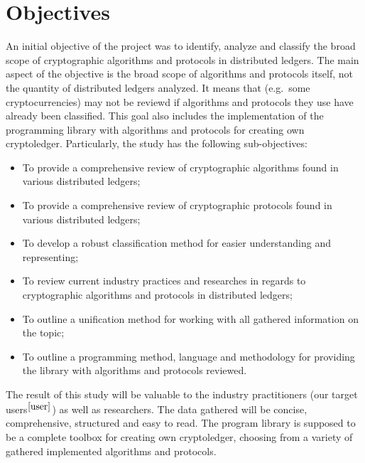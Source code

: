 \documentclass[12pt]{article}
\begin{document}
\section{Objectives}
An initial objective of the project was to identify, analyze and classify the
broad scope of cryptographic algorithms and protocols in distributed ledgers.
The main aspect of the objective is the broad scope of algorithms and protocols
itself, not the quantity of distributed ledgers analyzed. It means that (e.g.\
some cryptocurrencies) may not be reviewd if algorithms and protocols they use
have already been classified. This goal also includes the implementation of the
programming library with algorithms and protocols for creating own
cryptoledger.
Particularly, the study has the following sub-objectives:
\begin{itemize}
    \item To provide a comprehensive review of cryptographic algorithms found
          in various distributed ledgers;
    \item To provide a comprehensive review of cryptographic protocols found in
          various distributed ledgers;
    \item To develop a robust classification method for easier understanding
          and representing;
    \item To review current industry practices and researches in regards to
          cryptographic algorithms and protocols in distributed ledgers;
    \item To outline a unification method for working with all gathered
          information on the topic;
    \item To outline a programming method, language and methodology for
          providing the library with algorithms and protocols reviewed.
\end{itemize}
The result of this study will be valuable to the industry practitioners (our
target users\(^{\ref{user}}\)) as well as researchers. The data gathered will
be concise, comprehensive, structured and easy to read. The program library is
supposed to be a complete toolbox for creating own cryptoledger, choosing from
a variety of gathered implemented algorithms and protocols.
\end{document}
